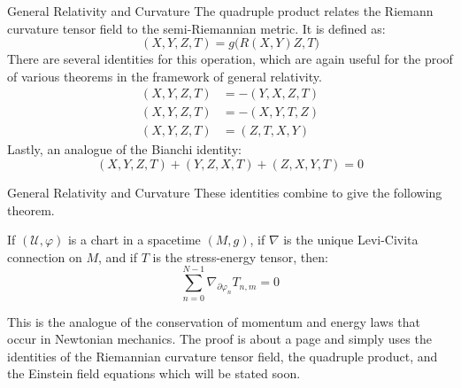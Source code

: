 \documentclass{beamer}
\begin{document}
    \begin{frame}{General Relativity and Curvature}
        The quadruple product relates the Riemann curvature tensor field to the
        semi-Riemannian metric. It is defined as:
        \begin{equation}
            (X,Y,Z,T)=g\big(R(X,Y)Z,T\big)
        \end{equation}
        There are several identities for this operation, which are again useful
        for the proof of various theorems in the framework of general
        relativity.
        \begin{align}
            (X,Y,Z,T)&=-(Y,X,Z,T)\\
            (X,Y,Z,T)&=-(X,Y,T,Z)\\
            (X,Y,Z,T)&=(Z,T,X,Y)
        \end{align}
        Lastly, an analogue of the Bianchi identity:
        \begin{equation}
            (X,Y,Z,T)+(Y,Z,X,T)+(Z,X,Y,T)=0
        \end{equation}
    \end{frame}
    \begin{frame}{General Relativity and Curvature}
        These identities combine to give the following theorem.
        \begin{theorem}
            If $(\mathcal{U},\varphi)$ is a chart in a spacetime $(M,g)$,
            if $\nabla$ is the unique Levi-Civita connection on $M$, and if
            $T$ is the stress-energy tensor, then:
            \begin{equation}
                \sum_{n=0}^{N-1}\nabla_{\partial\varphi_{n}}T_{n,m}=0
            \end{equation}
        \end{theorem}
        This is the analogue of the conservation of momentum and energy laws
        that occur in Newtonian mechanics. The proof is about a page and simply
        uses the identities of the Riemannian curvature tensor field, the
        quadruple product, and the Einstein field equations which will be
        stated soon.
    \end{frame}
\end{document}
